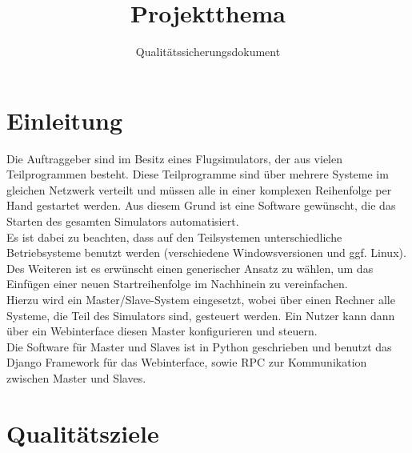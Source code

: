 \documentclass[accentcolor=tud9c,12pt,paper=a4]{tudreport}
\title{Projektthema}
\subtitle{Qualitätssicherungsdokument}
\begin{document}
	\maketitle
	\tableofcontents

	\chapter{Einleitung}
		Die Auftraggeber sind im Besitz eines Flugsimulators, der aus vielen 
		Teilprogrammen besteht. Diese Teilprogramme sind über mehrere Systeme im
		gleichen Netzwerk verteilt und müssen alle in einer komplexen Reihenfolge per Hand 
		gestartet werden. Aus diesem Grund ist eine Software gewünscht, die das Starten 
		des gesamten Simulators automatisiert.\\[5pt]
		Es ist dabei zu beachten, dass auf den Teilsystemen unterschiedliche 
		Betriebsysteme benutzt werden (verschiedene Windowsversionen und ggf. Linux). 
		Des Weiteren ist es erwünscht einen generischer Ansatz zu wählen, um das Einfügen 
		einer neuen Startreihenfolge im Nachhinein zu vereinfachen.\\[5pt]
		Hierzu wird ein Master/Slave-System eingesetzt, wobei über einen Rechner alle 
		Systeme, die Teil des Simulators sind, gesteuert werden. Ein Nutzer kann dann über
		ein Webinterface diesen Master konfigurieren und steuern.\\[5pt]
		Die Software für Master und Slaves ist in Python geschrieben und benutzt
		das Django Framework für das Webinterface, sowie RPC zur Kommunikation zwischen 
		Master und Slaves.
		

	\chapter{Qualitätsziele}
\end{document}
